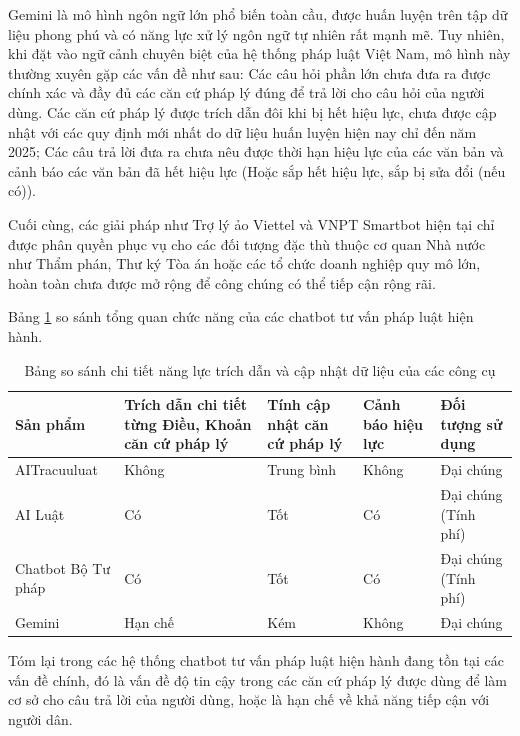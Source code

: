 \documentclass[../DoAn.tex]{subfiles}
\begin{document}
Gemini là mô hình ngôn ngữ lớn phổ biến toàn cầu, được huấn luyện trên tập dữ liệu phong phú và có năng lực xử lý ngôn ngữ tự nhiên rất mạnh mẽ. Tuy nhiên, khi đặt vào ngữ cảnh chuyên biệt của hệ thống pháp luật Việt Nam, mô hình này thường xuyên gặp các vấn đề như sau: Các câu hỏi phần lớn chưa đưa ra được chính xác và đầy đủ các căn cứ pháp lý đúng để trả lời cho câu hỏi của người dùng. Các căn cứ pháp lý được trích dẫn đôi khi bị hết hiệu lực, chưa được cập nhật với các quy định mới nhất do dữ liệu huấn luyện hiện nay chỉ đến năm 2025; Các câu trả lời đưa ra chưa nêu được thời hạn hiệu lực của các văn bản và cảnh báo các văn bản đã hết hiệu lực (Hoặc sắp hết hiệu lực, sắp bị sửa đổi (nếu có)). 

Cuối cùng, các giải pháp như Trợ lý ảo Viettel và VNPT Smartbot hiện tại chỉ được phân quyền phục vụ cho các đối tượng đặc thù thuộc cơ quan Nhà nước như Thẩm phán, Thư ký Tòa án hoặc các tổ chức doanh nghiệp quy mô lớn, hoàn toàn chưa được mở rộng để công chúng có thể tiếp cận rộng rãi.

Bảng \ref{table:fixed_legal_chatbots} so sánh tổng quan chức năng của các chatbot tư vấn pháp luật hiện hành.
\begin{table}[H]
\centering
\begin{tabular}{|p{2.5cm}|p{2.5cm}|p{2.5cm}|p{2.5cm}|p{2.5cm}|}
\hline
\textbf{Sản phẩm} & \textbf{Trích dẫn chi tiết từng Điều, Khoản căn cứ pháp lý} & \textbf{Tính cập nhật căn cứ pháp lý} & \textbf{Cảnh báo hiệu lực} & \textbf{Đối tượng sử dụng}\\ \hline
AITracuuluat & Không & Trung bình & Không & Đại chúng \\ \hline
AI Luật & Có & Tốt & Có & Đại chúng (Tính phí)\\ \hline
Chatbot Bộ Tư pháp & Có & Tốt & Có & Đại chúng (Tính phí)  \\ \hline
Gemini & Hạn chế & Kém & Không & Đại chúng \\ \hline
\end{tabular}
\caption{Bảng so sánh chi tiết năng lực trích dẫn và cập nhật dữ liệu của các công cụ}
\label{table:fixed_legal_chatbots}
\end{table}

Tóm lại trong các hệ thống chatbot tư vấn pháp luật hiện hành đang tồn tại các vấn đề chính, đó là vấn đề độ tin cậy trong các căn cứ pháp lý được dùng để làm cơ sở cho câu trả lời của người dùng, hoặc là hạn chế về khả năng tiếp cận với người dân. 
\end{document}
